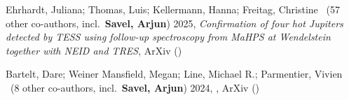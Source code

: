 \item[{\color{numcolor}\scriptsize2}] Ehrhardt, Juliana; Thomas, Luis; Kellermann, Hanna; Freitag, Christine \etal\ ({57} other co-authors, incl.\ \textbf{Savel, Arjun}) 2025, \emph{Confirmation of four hot Jupiters detected by TESS using follow-up spectroscopy from MaHPS at Wendelstein together with NEID and TRES}, ArXiv ()

\item[{\color{numcolor}\scriptsize1}] Bartelt, Dare; Weiner Mansfield, Megan; Line, Michael R.; Parmentier, Vivien \etal\ ({8} other co-authors, incl.\ \textbf{Savel, Arjun}) 2024, , ArXiv ()